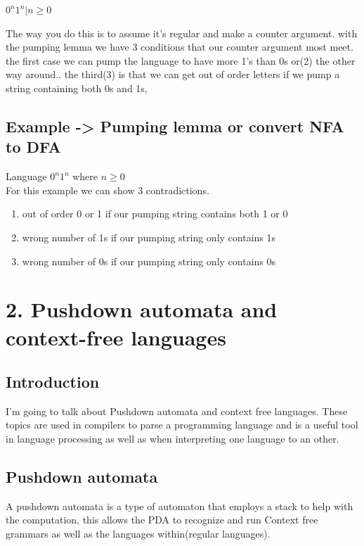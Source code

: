 \documentclass[a4paper,10pt,titlepage]{report}
\begin{document}
$0^n1^n | n \geq 0$

The way you do this is to assume it's regular and make a counter argument. with the pumping lemma we have 3 conditions that our counter argument most meet. the first case we can pump the language to have more 1's than 0s or(2) the other way around.. the third(3) is that we can get out of order letters if we pump a string containing both 0s and 1s, 
	


\subsection{Example -> Pumping lemma or convert NFA to DFA}

Language $0^n1^n $ where $n \geq 0$\\

For this example we can show 3 contradictions.\\

\begin{enumerate}
\item out of order 0 or 1 if our pumping string contains both 1 or 0
\item wrong number of 1s if our pumping string only contains 1s
\item wrong number of 0s if our pumping string only contains 0s 
\end{enumerate}

\newpage
\section{2. Pushdown automata and context-free languages}


\subsection{Introduction}
I'm going to talk about Pushdown automata and context free languages. These topics are used in compilers to parse a programming language and is a useful tool in language processing as well as when interpreting one language to an other.
\subsection{Pushdown automata}
A pushdown automata is a type of automaton that employs a stack to help with the computation, this allows the PDA to recognize and run Context free grammars as well as the languages within(regular languages).\\
\end{document}
